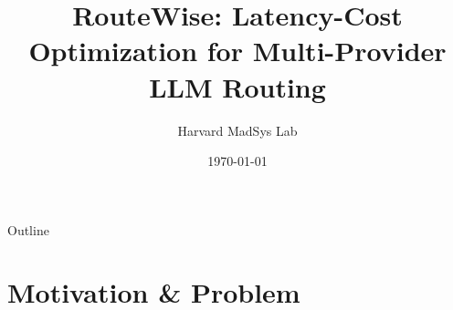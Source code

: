 \documentclass[aspectratio=169,10pt]{beamer}
\title[RouteWise]{RouteWise: Latency-Cost Optimization for Multi-Provider LLM Routing}
\author{Harvard MadSys Lab}
\institute{}
\date{\today}
\begin{document}
\begin{frame}
\titlepage
\end{frame}

\begin{frame}{Outline}
\tableofcontents
\end{frame}

\section{Motivation \& Problem}
\end{document}
